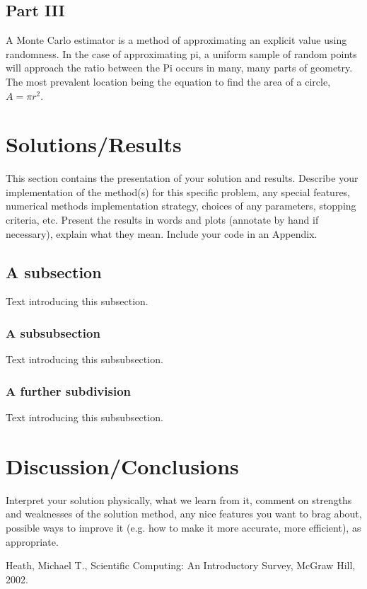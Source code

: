 \documentclass[11pt]{article}
\begin{document}
\subsection{Part III}\label{S:3.3}
A Monte Carlo estimator is a method of approximating an explicit value using randomness. In the case of approximating pi, a uniform sample of random points will approach the ratio between the
Pi occurs in many, many parts of geometry. The most prevalent location being the equation to find the area of a circle, $A=\pi r^2$.


\section{Solutions/Results}\label{S:4}
This section contains the presentation of your solution and results.
Describe your implementation of the method(s) for this specific problem, any special features, numerical methods implementation  strategy, choices of any parameters, stopping criteria, etc.
Present the results in words and plots (annotate by hand if necessary), explain what they mean. Include your code in an Appendix. 

\subsection{A subsection}
%
Text introducing this subsection. 

\subsubsection{A subsubsection}
%
Text introducing this subsubsection. 

\subsubsection{A further subdivision}
%
Text introducing this subsubsection. 

\section{Discussion/Conclusions}\label{S:5}
Interpret your solution physically, what we learn from it, comment on strengths and weaknesses of the solution method, any nice features you want to brag about, possible ways to improve it (e.g. how to make it more accurate, more efficient), as appropriate.


\begin{thebibliography}{100}
Heath, Michael T., Scientific Computing: An Introductory Survey, McGraw Hill, 2002.
%
%

\end{thebibliography}
\end{document}
